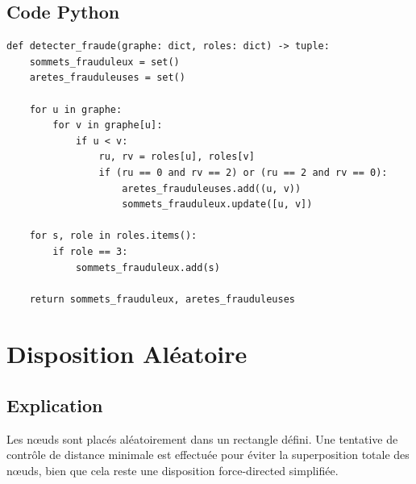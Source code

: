 \documentclass[12pt, a4paper]{article}
\begin{document}
\subsection{Code Python}
\begin{lstlisting}[style=python, caption={detecter\_fraude(graphe, roles)}]
def detecter_fraude(graphe: dict, roles: dict) -> tuple:
    sommets_frauduleux = set()
    aretes_frauduleuses = set()
    
    for u in graphe:
        for v in graphe[u]:
            if u < v:
                ru, rv = roles[u], roles[v]
                if (ru == 0 and rv == 2) or (ru == 2 and rv == 0):
                    aretes_frauduleuses.add((u, v))
                    sommets_frauduleux.update([u, v])

    for s, role in roles.items():
        if role == 3:
            sommets_frauduleux.add(s)

    return sommets_frauduleux, aretes_frauduleuses
\end{lstlisting}

\section{Disposition Aléatoire}
\subsection{Explication}
\begin{tcolorbox}[explication]
    Les nœuds sont placés aléatoirement dans un rectangle défini. Une tentative de contrôle de distance minimale est effectuée pour éviter la superposition totale des nœuds, bien que cela reste une disposition force-directed simplifiée.
\end{tcolorbox}
\end{document}
